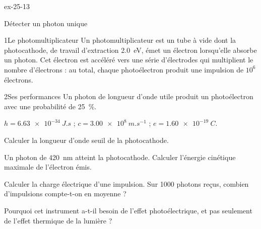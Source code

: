 \begin{blocLivre}{ex-25-13}
\begin{exercice}[3]{Détecter un photon unique}
\begin{docu}{1}{Le photomultiplicateur}
Un photomultiplicateur est un tube à vide dont la photocathode, de travail d'extraction \qty{2,0}{eV}, émet un électron
lorsqu'elle absorbe un photon. Cet électron est accéléré vers une série d'électrodes qui multiplient le nombre
d'électrons : au total, chaque photoélectron produit une impulsion de $10^6$ électrons.
\end{docu}
\begin{docu}{2}{Ses performances}
Un photon de longueur d'onde utile produit un photoélectron avec une probabilité de 25~\%.
\end{docu}
\begin{donnees}
$h=\qty{6,63e-34}{J.s}$ ; $c=\qty{3,00e8}{m.s^{-1}}$ ; $e=\qty{1,60e-19}{C}$.
\end{donnees}
\begin{questions}
\item Calculer la longueur d'onde seuil de la photocathode.
\item Un photon de \qty{420}{nm} atteint la photocathode. Calculer l'énergie cinétique maximale de l'électron émis.
\item \initiative Calculer la charge électrique d'une impulsion. Sur \num{1000} photons reçus, combien d'impulsions compte-t-on en
moyenne ?
\item Pourquoi cet instrument a-t-il besoin de l'effet photoélectrique, et pas seulement de l'effet thermique de la
lumière ?
\end{questions}
\end{exercice}
\end{blocLivre}
